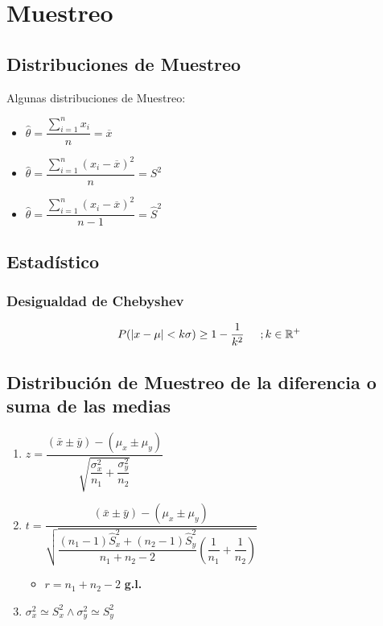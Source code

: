 \documentclass[10pt,letterpaper]{article}
\begin{document}
\section{Muestreo}
\subsection{Distribuciones de Muestreo}
Algunas distribuciones de Muestreo:
\begin{multicols}{3}
\begin{itemize}
\item $\widehat{\theta}=\dfrac{\displaystyle\sum_{i=1}^{n} x_i}{n}=\overline{x}$
\end{itemize}
\columnbreak
\begin{itemize}
\item $\widehat{\theta}=\dfrac{\displaystyle\sum_{i=1}^{n} (x_i-\overline{x})^2}{n}=S^2$
\end{itemize}
\columnbreak
\begin{itemize}
\item $\widehat{\theta}=\dfrac{\displaystyle\sum_{i=1}^{n} (x_i-\overline{x})^2}{n-1}=\widehat{S}^2$
\end{itemize}
\end{multicols}
\subsection{Estadístico}
\subsubsection{Desigualdad de Chebyshev}
$$
P(|x-\mu|<k\sigma) \geq 1-\dfrac{1}{k^2} \hspace{0.5cm};k\in \mathbb{R^+}
$$
\subsection{Distribución de Muestreo de la diferencia o suma de las medias}
\begin{enumerate}[label=\Roman*)]
  \item $z=\dfrac{(\bar{x}\pm\bar{y})-(\mu_x\pm\mu_y)}{\sqrt{\dfrac{\sigma_{x}^2}{n_1}+\dfrac{\sigma_{y}^2}{n_2}}}$
  \item $t=\dfrac{(\bar{x}\pm\bar{y})-(\mu_x\pm\mu_y)}{\sqrt{\dfrac{(n_1-1)\hat{S}_x^2+(n_2-1)\hat{S}_y^2}{n_1 + n_2 - 2}\left( \dfrac{1}{n_1}+\dfrac{1}{n_2} \right) }}$ \\
  \begin{itemize}
  \item $r = n_1 +n_2 -2$ \textbf{g.l.}
  \end{itemize}
  \item $\sigma_x^2 \simeq S_x^2 \wedge \sigma_y^2 \simeq S_y^2$
\end{enumerate}
\end{document}
